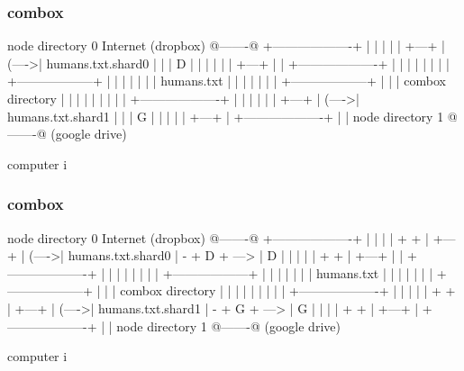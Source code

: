 \begin{frame}[fragile]
  \frametitle{combox}

  {\tiny
  \begin{semiverbatim}

         node directory 0                Internet
         (dropbox)                       @-------@
        +-------------------+            |       |
        |                   |            | +---+ |
  (---->| humans.txt.shard0 |            | | D | |
  |     |                   |            | +---+ |
  |     +-------------------+            |       |
  |                                      |       |
  |                                      |       |
 +------------------+                    |       |
 |                  |                    |       |
 |  humans.txt      |                    |       |
 |                  |                    |       |
 +------------------+                    |       |
  |  combox directory                    |       |
  |                                      |       |
  |                                      |       |
  |     +-------------------+            |       |
  |     |                   |            | +---+ |
  (---->| humans.txt.shard1 |            | | G | |
        |                   |            | +---+ |
        +-------------------+            |       |
         node directory 1                @-------@
         (google drive)

  computer i
  \end{semiverbatim}
  }

\end{frame}

\begin{frame}[fragile]
  \frametitle{combox}

  {\tiny
  \begin{semiverbatim}

         node directory 0                Internet
         (dropbox)                       @-------@
        +-------------------+            |       |
        |                   |    + +     | +---+ |
  (---->| humans.txt.shard0 | - + D + ---> | D | |
  |     |                   |    + +     | +---+ |
  |     +-------------------+            |       |
  |                                      |       |
  |                                      |       |
 +------------------+                    |       |
 |                  |                    |       |
 |  humans.txt      |                    |       |
 |                  |                    |       |
 +------------------+                    |       |
  |  combox directory                    |       |
  |                                      |       |
  |                                      |       |
  |     +-------------------+            |       |
  |     |                   |    + +     | +---+ |
  (---->| humans.txt.shard1 | - + G + ---> | G | |
        |                   |    + +     | +---+ |
        +-------------------+            |       |
         node directory 1                @-------@
         (google drive)

  computer i
  \end{semiverbatim}
  }

\end{frame}


